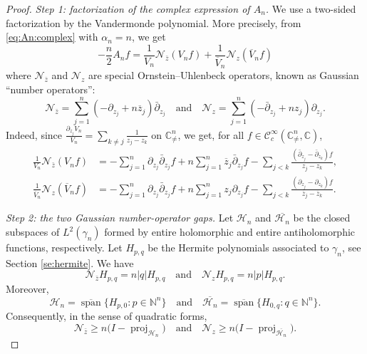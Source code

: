 \documentclass[11pt,reqno]{amsart}
\numberwithin{equation}{section}%
\numberwithin{figure}{section}%
\numberwithin{table}{section}
\theoremstyle{plain}
\theoremstyle{definition}
\begin{document}
\begin{proof}

\noindent\emph{Step 1: factorization of the complex expression of $A_n$.}
We use a two-sided factorization by the Vandermonde polynomial.
More precisely, from \eqref{eq:An:complex} with $\alpha_n=n$, we get
\begin{equation}\label{eq:generator-two-sided-factorization}
  -\frac{n}{2}A_nf
  =
  \frac{1}{V_n}\mathcal{N}_{\bar z}(V_nf)
  +
  \frac{1}{\overline V_n}\mathcal{N}_{z}(\overline V_nf)
\end{equation}
where $\mathcal{N}_{\bar z}$ and $\mathcal{N}_{z}$ are special
Ornstein--Uhlenbeck operators, known as Gaussian ``number operators'':
\begin{equation}\label{eq:two-number-operators}
  \mathcal{N}_{\bar z}
  =\sum_{j=1}^n
  \left(-\partial_{z_j}+n\overline z_j\right)\bar\partial_{z_j}
  \quad\text{and}\quad
  \mathcal{N}_{z}
  =\sum_{j=1}^n
  \left(-\bar\partial_{z_j}+nz_j\right)\partial_{z_j}.
\end{equation}
Indeed, since $\frac{\partial_{z_j}V_n}{V_n}=\sum_{k\neq j}\frac{1}{z_j-z_k}$
on $\mathbb{C}^n_{\neq}$, we get, for all
$f\in\mathcal{C}_c^\infty(\mathbb{C}^n_{\neq},\mathbb{C})$,
\begin{align}
  \frac{1}{V_n}\mathcal{N}_{\bar z}(V_nf)
  &=-\sum_{j=1}^n\partial_{z_j}\bar\partial_{z_j}f
  +n\sum_{j=1}^n\overline z_j\bar\partial_{z_j}f
  -\sum_{j<k}
  \frac{(\bar\partial_{z_j}-\bar\partial_{z_k})f}{z_j-z_k},
  \label{eq:first-vandermonde-factor}\\
  \frac{1}{\overline V_n}\mathcal{N}_{z}(\overline V_nf)
  &=-\sum_{j=1}^n\partial_{z_j}\bar\partial_{z_j}f
  +n\sum_{j=1}^nz_j\partial_{z_j}f
  -\sum_{j<k}
  \frac{(\partial_{z_j}-\partial_{z_k})f}
  {\overline z_j-\overline z_k}.
  \label{eq:second-vandermonde-factor}
\end{align}

\noindent\emph{Step 2: the two Gaussian number-operator gaps.}
Let $\mathcal{H}_n$ and $\overline{\mathcal{H}_n}$ be the closed subspaces of
$L^2(\gamma_n)$ formed by entire holomorphic and entire antiholomorphic
functions, respectively. Let $H_{p,q}$ be the Hermite polynomials associated
to $\gamma_n$, see Section \ref{se:hermite}. We have
\begin{equation}
  \mathcal{N}_{\bar z}H_{p,q} = n|q|H_{p,q}
  \quad\text{and}\quad
  \mathcal{N}_{z}H_{p,q} = n|p|H_{p,q}.
\end{equation}
Moreover,
\begin{equation}
  \mathcal{H}_n = \overline{\operatorname{span}} \{H_{p,0}:p\in\mathbb{N}^n\}
  \quad\text{and}\quad
  \overline{\mathcal{H}_n} = \overline{\operatorname{span}} \{H_{0,q}:q\in\mathbb{N}^n\}.
\end{equation}
Consequently, in the sense of quadratic forms,
\begin{equation}\label{eq:two-number-operator-gaps}
  \mathcal{N}_{\bar z} \geq n\bigl(I-\operatorname{proj}_{\mathcal{H}_n}\bigr)
  \quad\text{and}\quad
  \mathcal{N}_{z} \geq n\bigl(I-\operatorname{proj}_{\overline{\mathcal{H}_n}}\bigr).
\end{equation}


\end{proof}
\end{document}
